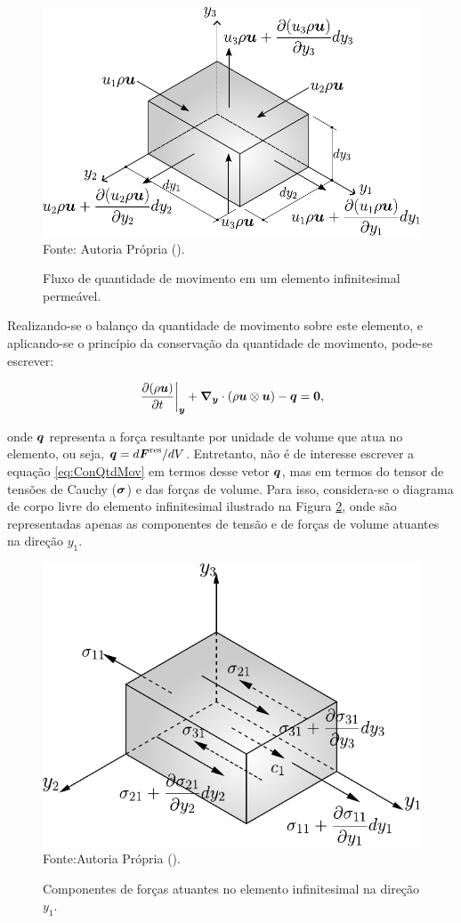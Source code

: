 \begin{figure}[h!]
    \centering
    \caption{Fluxo de quantidade de movimento em um elemento infinitesimal permeável.}
    \includegraphics[width=.55\linewidth]{Figuras/ConQtdMov.pdf}
    \\Fonte: Autoria Própria (\the\year).
    \label{fig:ConQtdMov}
\end{figure}

Realizando-se o balanço da quantidade de movimento sobre este elemento, e aplicando-se o princípio da conservação da quantidade de movimento, pode-se escrever:

\begin{equation}
    \left.\frac{\partial{(\rho \boldsymbol{u})}}{\partial{t}}\right|_{\boldsymbol{y}}+\boldsymbol{\nabla_y}\cdot(\rho \boldsymbol{u}\otimes\boldsymbol{u})-\boldsymbol{q}=\boldsymbol{0}\text{,}
    \label{eq:ConQtdMov}
\end{equation}

\noindent onde $\boldsymbol{q}$ representa a força resultante por unidade de volume que atua no elemento, ou seja, $\boldsymbol{q}=d\boldsymbol{F}^\mathrm{res}/dV$. Entretanto, não é de interesse escrever a equação \eqref{eq:ConQtdMov} em termos desse vetor $\boldsymbol{q}$, mas em termos do tensor de tensões de Cauchy ($\boldsymbol{\sigma}$) e das forças de volume. Para isso, considera-se o diagrama de corpo livre do elemento infinitesimal ilustrado na Figura \ref{fig:EqFor}, onde são representadas apenas as componentes de tensão e de forças de volume atuantes na direção $y_1$.

\begin{figure}[h!]
    \centering
    \caption{Componentes de forças atuantes no elemento infinitesimal na direção $y_1$.}
    \includegraphics[width=.5\linewidth]{Figuras/EqFor.pdf}
    \\Fonte:Autoria Própria (\the\year).
    \label{fig:EqFor}
\end{figure}

